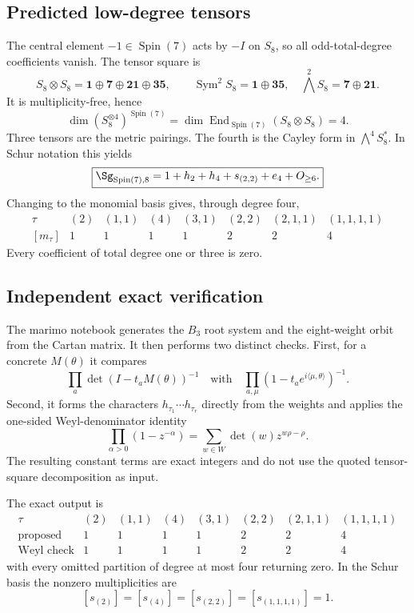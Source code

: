 \documentclass[10pt]{article}
\begin{document}
\subsection{Predicted low-degree tensors}
The central element $-1\in\operatorname{Spin}(7)$ acts by $-I$ on $S_8$,
so all odd-total-degree coefficients vanish.  The tensor square is
\[
 S_8\otimes S_8=\mathbf1\oplus\mathbf7\oplus\mathbf{21}\oplus\mathbf{35},
 \qquad
 \operatorname{Sym}^2S_8=\mathbf1\oplus\mathbf{35},\quad
 \bigwedge^2S_8=\mathbf7\oplus\mathbf{21}.
\]
It is multiplicity-free, hence
\[
 \dim(S_8^{\otimes4})^{\operatorname{Spin}(7)}
 =\dim\operatorname{End}_{\operatorname{Spin}(7)}(S_8\otimes S_8)=4.
\]
Three tensors are the metric pairings.  The fourth is the Cayley form in
$\bigwedge^4S_8^*$.  In Schur notation this yields
\[
 \boxed{\Sg_{\operatorname{Spin}(7),8}
 =1+h_2+h_4+s_{(2,2)}+e_4+O_{\ge6}.}
\]
Changing to the monomial basis gives, through degree four,
\[
\begin{array}{c|rrrrrrr}
\tau&(2)&(1,1)&(4)&(3,1)&(2,2)&(2,1,1)&(1,1,1,1)\\ \hline
[m_\tau]&1&1&1&1&2&2&4
\end{array}
\]
Every coefficient of total degree one or three is zero.

\subsection{Independent exact verification}
The marimo notebook generates the $B_3$ root system and the eight-weight
orbit from the Cartan matrix.  It then performs two distinct checks.
First, for a concrete $M(\theta)$ it compares
\[
 \prod_a\det(I-t_aM(\theta))^{-1}
 \quad\text{with}\quad
 \prod_{a,\mu}(1-t_a e^{i\langle\mu,\theta\rangle})^{-1}.
\]
Second, it forms the characters $h_{\tau_1}\cdots h_{\tau_r}$ directly from
the weights and applies the one-sided Weyl-denominator identity
\[
 \prod_{\alpha>0}(1-z^{-\alpha})
 =\sum_{w\in W}\det(w)z^{w\rho-\rho}.
\]
The resulting constant terms are exact integers and do not use the quoted
tensor-square decomposition as input.

The exact output is
\[
\begin{array}{c|rrrrrrr}
\tau&(2)&(1,1)&(4)&(3,1)&(2,2)&(2,1,1)&(1,1,1,1)\\ \hline
\text{proposed}&1&1&1&1&2&2&4\\
\text{Weyl check}&1&1&1&1&2&2&4
\end{array}
\]
with every omitted partition of degree at most four returning zero.  In the
Schur basis the nonzero multiplicities are
\[
 [s_{(2)}]=[s_{(4)}]=[s_{(2,2)}]=[s_{(1,1,1,1)}]=1.
\]
\end{document}
